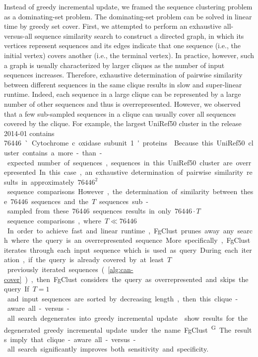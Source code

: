 \documentclass{bioinfo}
\begin{document}
\begin{methods}
Instead of greedy incremental update, we framed the sequence clustering problem as a dominating-set problem.
The dominating-set problem can be solved in linear time by greedy set cover.
First, we attempted to perform an exhaustive all-versus-all sequence similarity search to construct a directed graph, in which its vertices represent sequences and its edges indicate that one sequence (i.e., the initial vertex) covers another (i.e., the terminal vertex).
In practice, however, such a graph is usually characterized by larger cliques as the number of input sequences increases.
Therefore, exhaustive determination of pairwise similarity between different sequences in the same clique results in slow and super-linear runtime.
Indeed, each sequence in a large clique can be represented by a large number of other sequences and thus is overrepresented.
However, we observed that a few sub-sampled sequences in a clique can usually cover all sequences covered by the clique.
For example, the largest UniRef50 cluster in the release 2014-01 contains \SI{76446} `Cytochrome c oxidase subunit 1' proteins \citep{suzek2014uniref}.
Because this UniRef50 cluster contains a more-than-expected number of sequences, sequences in this UniRef50 cluster are overrepresented.
In this case, an exhaustive determination of pairwise similarity results in approximately \({76446}^2\) sequence comparisons.
However, the determination of similarity between these \SI{76446} sequences and the \(T\) sequences sub-sampled from these \SI{76446} sequences results in only \({76446}\cdot T\) sequence comparisons, where \(T\ll{76446}\).
In order to achieve fast and linear runtime, FgClust prunes away any search where the query is an overrepresented sequence.
More specifically, FgClust iterates through each input sequence which is used as query.
During each iteration,
	if the query is already covered by at least \(T\) previously iterated sequences (\cref{alg:can-cover}), then FgClust considers the query as overrepresented and skips the query.
If \(T=1\) and input sequences are sorted by decreasing length, then this clique-aware all-versus-all search degenerates into greedy incremental update.
 show results for the degenerated greedy incremental update under the name FgClust\textsuperscript{G}. The results imply that clique-aware all-versus-all search significantly improves both sensitivity and specificity.



\end{methods}
\end{document}
